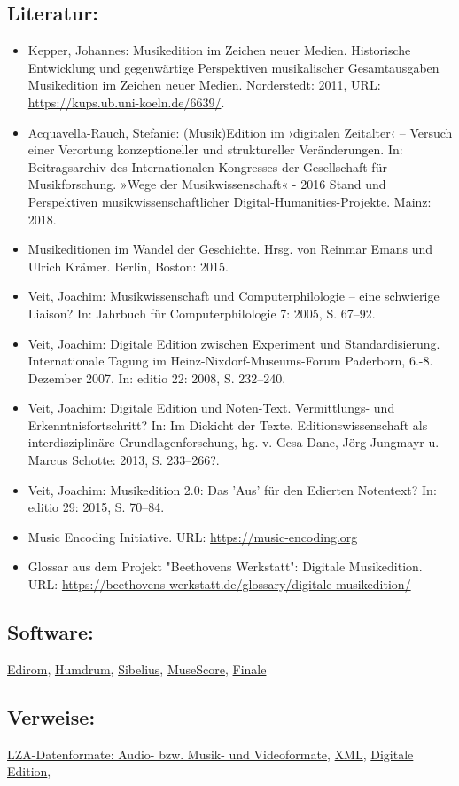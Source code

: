 \documentclass{article}
\begin{document}
        \subsection*{Literatur:}\begin{itemize}\item Kepper, Johannes: Musikedition im Zeichen neuer Medien. Historische Entwicklung und gegenwärtige Perspektiven musikalischer Gesamtausgaben Musikedition im Zeichen neuer Medien. Norderstedt: 2011, URL: \url{https://kups.ub.uni-koeln.de/6639/}.\item Acquavella-Rauch, Stefanie: (Musik)Edition im ›digitalen Zeitalter‹ – Versuch einer Verortung konzeptioneller und struktureller Veränderungen. In: Beitragsarchiv des Internationalen Kongresses der Gesellschaft für Musikforschung. »Wege der Musikwissenschaft« - 2016 Stand und Perspektiven musikwissenschaftlicher Digital-Humanities-Projekte. Mainz: 2018.\item Musikeditionen im Wandel der Geschichte. Hrsg. von Reinmar Emans und Ulrich Krämer. Berlin, Boston: 2015.\item Veit, Joachim: Musikwissenschaft und Computerphilologie – eine schwierige Liaison? In: Jahrbuch für Computerphilologie 7: 2005, S. 67–92.\item Veit, Joachim: Digitale Edition zwischen Experiment und Standardisierung. Internationale Tagung im Heinz-Nixdorf-Museums-Forum Paderborn, 6.-8. Dezember 2007. In: editio 22: 2008, S. 232–240.\item Veit, Joachim: Digitale Edition und Noten-Text. Vermittlungs- und Erkenntnisfortschritt? In: Im Dickicht der Texte. Editionswissenschaft als interdisziplinäre Grundlagenforschung, hg. v. Gesa Dane, Jörg Jungmayr u. Marcus Schotte: 2013, S. 233–266?.\item Veit, Joachim: Musikedition 2.0: Das 'Aus' für den Edierten Notentext? In: editio 29: 2015, S. 70–84.\item Music Encoding Initiative. URL: \url{https://music-encoding.org}\item Glossar aus dem Projekt "Beethovens Werkstatt": Digitale Musikedition. URL: \url{https://beethovens-werkstatt.de/glossary/digitale-musikedition/}\end{itemize}\subsection*{Software:}\href{https://www.edirom.de/edirom-projekt/index.html}{Edirom}, \href{https://www.humdrum.org}{Humdrum}, \href{https://www.sibelius.at}{Sibelius}, \href{https://musescore.com}{MuseScore}, \href{https://www.finalemusic.com}{Finale}\subsection*{Verweise:}\href{https://gams.uni-graz.at/o:konde.121}{LZA-Datenformate: Audio- bzw. Musik- und Videoformate}, \href{https://gams.uni-graz.at/o:konde.215}{XML}, \href{https://gams.uni-graz.at/o:konde.59}{Digitale Edition}, 
\end{document}
